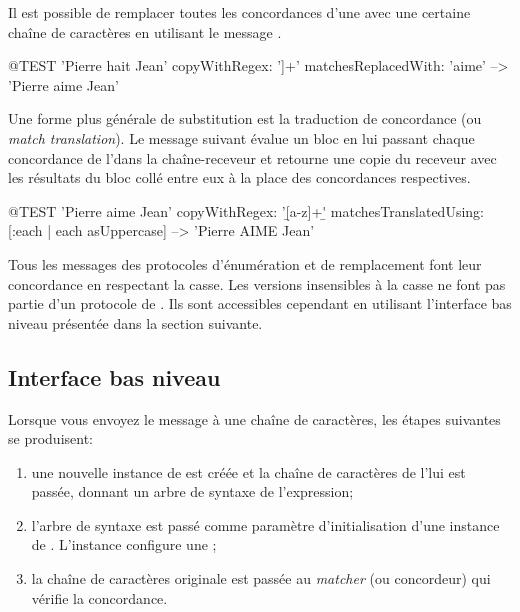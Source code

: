 \documentclass[a4paper,10pt,twoside]{book}
\begin{document}
{Il est possible de remplacer toutes les concordances d'une \expreg
avec une certaine chaîne de caractères en utilisant le message  .

\begin{code}{@TEST}
'Pierre hait Jean' copyWithRegex: '\<[[:lower:]]+\>' matchesReplacedWith: 'aime' -->  'Pierre aime Jean'
\end{code}

Une forme plus générale de substitution est la traduction de
concordance (ou \emph{match translation}). Le message suivant évalue
un bloc en lui passant chaque concordance de l'\expreg dans la
chaîne-receveur et retourne une copie du receveur avec les résultats
du bloc collé entre eux à la place des concordances respectives.

\begin{code}{@TEST}
'Pierre aime Jean' copyWithRegex: '\b[a-z]+\b' matchesTranslatedUsing:
[:each | each asUppercase] --> 'Pierre AIME Jean'
\end{code}

Tous les messages des protocoles d'énumération et de remplacement font
leur concordance en respectant la casse. Les versions insensibles à la
casse ne font pas partie d'un protocole de .
Ils sont accessibles cependant en utilisant l'interface bas niveau
présentée dans la section suivante.
\subsection{Interface bas niveau}

Lorsque vous envoyez le message  à une
chaîne de caractères, les étapes suivantes se produisent:

\begin{enumerate}
\item une nouvelle instance de  est créée et la
  chaîne de caractères de l'\expreg lui est passée, donnant un arbre
  de syntaxe de l'expression;
\item  l'arbre de syntaxe est passé comme paramètre d'initialisation
  d'une instance de . L'instance configure une
  ;
\item la chaîne de caractères originale est passée au \emph{matcher}
  (ou concordeur)
  qui vérifie la concordance.
\end{enumerate}

}
\end{document}
